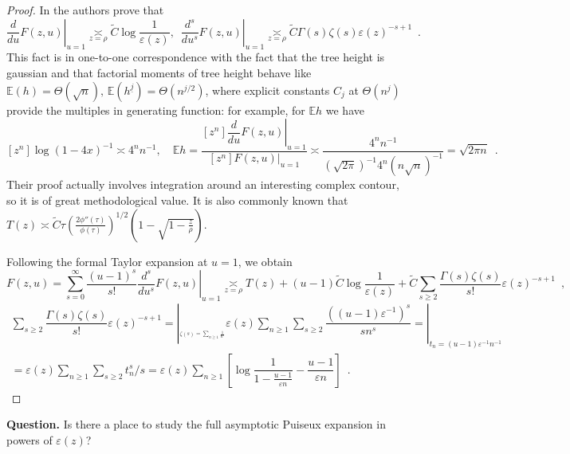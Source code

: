 \documentclass[a4paper]{article}
\begin{document}
\begin{proof}
In \cite{average_height} the authors prove that
\begin{equation}
    \left.\dfrac{d}{du}F(z,u)\right|_{u=1} \underset{z = \rho}{\asymp}
    \widetilde C \log \dfrac{1}{\varepsilon(z)}
    , \enspace 
    \left. \dfrac{d^s}{du^s} F(z, u) \right|_{u=1} \underset{z = \rho}{\asymp}
    \widetilde C \Gamma(s) \zeta(s) \varepsilon(z)^{-s+1}
    \enspace .
\end{equation}
This fact is in one-to-one correspondence with the fact that the tree height is
gaussian and that factorial moments of tree
height behave like \( \mathbb E (h) = \Theta( \sqrt{n} ), \, \mathbb
E(h^{\underline j}) 
= \Theta(n^{j/2}) \), where explicit constants \( C_j \) at \( \Theta(n^j) \) provide
the multiples in generating function: for example, for \( \mathbb E h \) we have
\[
    [z^n] \log(1 - 4x)^{-1} \asymp 4^n n^{-1}, \quad
    \mathbb E h
    =
    \dfrac
        {[z^n] \left. \dfrac{d}{du} F(z, u) \right|_{u=1}}
        {[z^n] \left. F(z, u) \right|_{u=1}}
     \asymp \dfrac{4^n n^{-1}}{(\sqrt{2 \pi})^{-1} 4^n (n \sqrt{n})^{-1}} =
\sqrt{2 \pi n}
    \enspace .
\]
Their proof actually involves integration around an interesting complex contour,
so it is of great methodological value. It is also commonly known that
\( 
    T(z) \asymp \widetilde C \tau
    \left(
        \frac{2 \phi''(\tau)}
            {\phi(\tau)}
    \right)^{1/2}
    \left(
        1 - \sqrt{1 - \frac z \rho}
    \right)
\).

Following the formal Taylor expansion at \( u = 1 \), we obtain
\begin{equation}
    F(z, u) =
    \sum_{s = 0}^\infty
        \dfrac{(u-1)^s}{s!}
        \left.
            \dfrac{d^s}{du^s} F(z, u)
        \right|_{u=1}
    \underset{z = \rho}\asymp
    T(z) + (u-1)\widetilde C \log \dfrac{1}{\varepsilon(z)} 
    +
    \widetilde C
    \sum_{s \geq 2}
    \dfrac
        {\Gamma(s) \zeta(s)}{s!}
    \varepsilon(z)^{-s+1}
    \enspace ,
\end{equation}%
\vspace{-0.5cm}
\begin{multline*}
    \sum_{s \geq 2}
    \dfrac
        {\Gamma(s) \zeta(s)}{s!}
    \varepsilon(z)^{-s+1}
    =
    \left|_{\underset{\zeta(s) = \sum_{n \geq 1} \tfrac{1}{n^s}}{} }
    \varepsilon(z) \sum_{n \geq 1} \sum_{s \geq 2}
        \dfrac{( (u-1)\varepsilon^{-1} )^s}{s n^s} 
    = \right|_{t_n = (u-1) \varepsilon^{-1} n^{-1}}
    \\
    =
    \varepsilon(z) \sum_{n \geq 1} \sum_{s \geq 2} t_n^s/s
    =
    \varepsilon(z) \sum_{n \geq 1}
    \left[
        \log \dfrac{1}{1 - \tfrac{u-1}{\varepsilon n}} - \dfrac{u-1}{\varepsilon n} 
    \right]
    \enspace .
\end{multline*}
\end{proof}
\vspace{-0.7cm}
\textbf{Question.} Is there a place to study the full asymptotic Puiseux expansion in
powers of \(
\varepsilon(z) \)?



\end{document}
